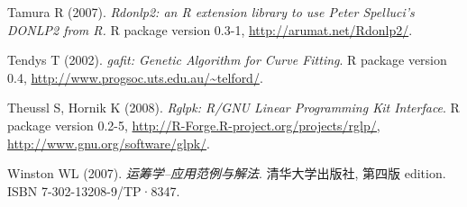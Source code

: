 \documentclass{article}
\begin{document}
\begin{thebibliography}{20}
Tamura R (2007).
\newblock \emph{Rdonlp2: an R extension library to use Peter Spelluci's DONLP2
  from R.}
\newblock R package version 0.3-1, \urlprefix\url{http://arumat.net/Rdonlp2/}.

Tendys T (2002).
\newblock \emph{gafit: Genetic Algorithm for Curve Fitting}.
\newblock R package version 0.4,
  \urlprefix\url{http://www.progsoc.uts.edu.au/~telford/}.

Theussl S, Hornik K (2008).
\newblock \emph{Rglpk: R/GNU Linear Programming Kit Interface}.
\newblock R package version 0.2-5,
  \urlprefix\url{http://R-Forge.R-project.org/projects/rglp/,
  http://www.gnu.org/software/glpk/}.

Winston WL (2007).
\newblock \emph{运筹学--应用范例与解法}.
\newblock 清华大学出版社, 第四版 edition.
\newblock ISBN 7-302-13208-9/TP·8347.

\end{thebibliography}
\end{document}
